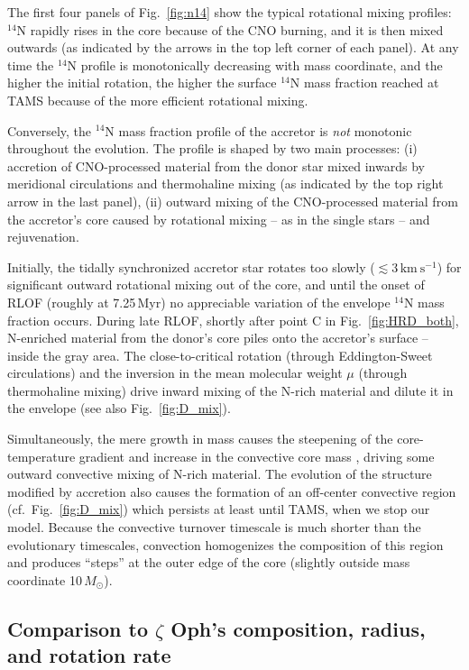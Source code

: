 \documentclass[twocolumn,twocolappendix,trackchanges]{aastex63}
\newcommand{\kms}{{\mathrm{km\ s^{-1}}}}
\DeclareRobustCommand{\Figref}[1]{Fig.~\ref{#1}}
\newcommand{\zoph}{$\zeta$ Oph}
\begin{document}
The first four panels of \Figref{fig:n14} show the typical rotational
mixing profiles: $^{14}\mathrm{N}$ rapidly rises in the core because
of the CNO burning, and it is then mixed outwards (as indicated by the
arrows in the top left corner of each panel). At any time the
$^{14}\mathrm{N}$ profile is monotonically decreasing with mass
coordinate, and the higher the initial rotation, the higher the
surface $^{14}\mathrm{N}$ mass fraction reached at TAMS because of the
more efficient rotational mixing.

Conversely, the $^{14}\mathrm{N}$ mass fraction profile of the
accretor is \emph{not} monotonic throughout the evolution.  The
profile is shaped by two main processes: (i) accretion of
CNO-processed material from the donor star mixed inwards by meridional
circulations and thermohaline mixing (as indicated by the top right
arrow in the last panel), (ii) outward mixing of the CNO-processed
material from the accretor's core caused by rotational mixing -- as in
the single stars -- and rejuvenation.

Initially, the tidally synchronized accretor star rotates too slowly
($\lesssim 3\,\kms$) for significant outward rotational mixing out of
the core, and until the onset of RLOF (roughly at 7.25\,Myr) no
appreciable variation of the envelope $^{14}\mathrm{N}$ mass fraction
occurs. During late RLOF, shortly after point C in
\Figref{fig:HRD_both}, N-enriched material from the donor's core piles
onto the accretor's surface -- inside the gray area. The
close-to-critical rotation (through Eddington-Sweet circulations) and
the inversion in the mean molecular weight $\mu$ (through thermohaline
mixing) drive inward mixing of the N-rich material and dilute it in
the envelope (see also \Figref{fig:D_mix}).

Simultaneously, the mere growth in mass causes the steepening of the
core-temperature gradient and increase in the convective core mass
\citep[rejuvenation, e.g.,][]{schneider:16}, driving some outward
convective mixing of N-rich material. The evolution of the structure
modified by accretion also causes the formation of an off-center
convective region (cf.~\Figref{fig:D_mix}) which persists at least
until TAMS, when we stop our model. Because the convective turnover
timescale is much shorter than the evolutionary timescales, convection
homogenizes the composition of this region and produces ``steps'' at
the outer edge of the core (slightly outside mass coordinate
10\,$M_\odot$).

\subsection{Comparison to \zoph's composition, radius, and rotation rate}
\label{sec:surf_comp}

\end{document}
